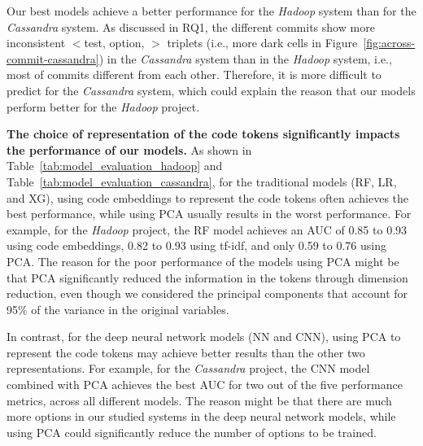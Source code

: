 Our best models achieve a better performance for the \emph{Hadoop} system 
than for the \emph{Cassandra} system. %
As discussed in RQ1, the different commits show more inconsistent $<$test, option, \inconsistent$>$ triplets (i.e., more dark cells in Figure~\ref{fig:across-commit-cassandra}) in the \emph{Cassandra} system than in the \emph{Hadoop} system, i.e., most of commits different from each other. Therefore, it is more difficult to predict \inconsistent for the \emph{Cassandra} system, which could explain the reason that our models perform better for the \emph{Hadoop} project. %

\noindent \textbf{The choice of representation of the code tokens significantly impacts the performance of our models.} As shown in Table~\ref{tab:model_evaluation_hadoop} and Table~\ref{tab:model_evaluation_cassandra}, for the traditional models (RF, LR, and XG), using code embeddings to represent the code tokens often achieves the best performance, while using PCA usually results in the worst performance. For example, for the \emph{Hadoop} project, the RF model achieves an AUC of 0.85 to 0.93 using code embeddings, 0.82 to 0.93 using tf-idf, and only 0.59 to 0.76 using PCA. The reason for the poor performance of the models using PCA might be that PCA significantly reduced the information in the tokens through dimension reduction, even though we considered the principal components that account for 95\% of the variance in the original variables.

In contrast, for the deep neural network models (NN and CNN), using PCA to represent the code tokens may achieve better results than the other two representations. For example, for the \emph{Cassandra} project, the CNN model combined with PCA achieves the best AUC for two out of the five performance metrics, across all different models.
The reason might be that there are much more options in our studied systems %
in the deep neural network models, while using PCA could significantly reduce the number of options to be trained.

